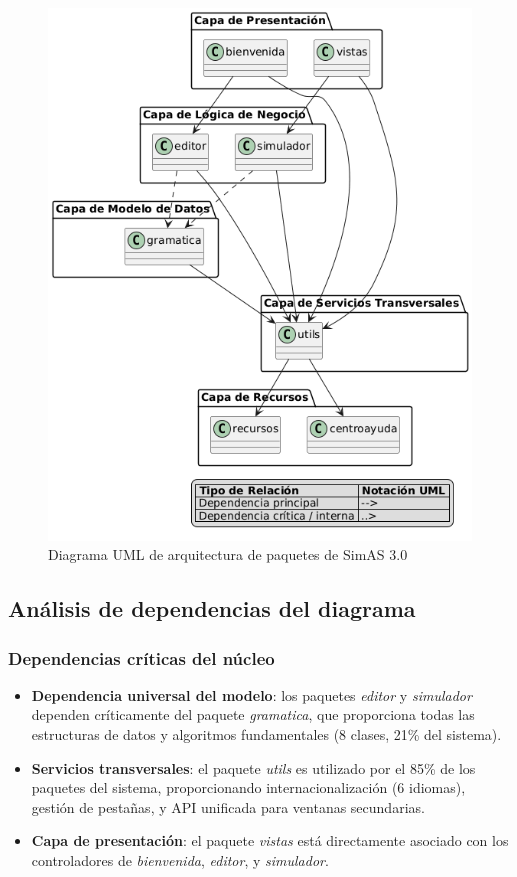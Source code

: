 \begin{figure}[H]
\centering
\includegraphics[width=\textwidth]{figuras/Cap8/diagrama_paquetes.png}
\caption{Diagrama UML de arquitectura de paquetes de SimAS 3.0}
\label{dpaquetes}
\end{figure}

\subsection{Análisis de dependencias del diagrama}

\subsubsection{Dependencias críticas del núcleo}

\begin{itemize}
    \item \textbf{Dependencia universal del modelo}: los paquetes \textit{editor} y \textit{simulador} dependen críticamente del paquete \textit{gramatica}, que proporciona todas las estructuras de datos y algoritmos fundamentales (8 clases, 21\% del sistema).

    \item \textbf{Servicios transversales}: el paquete \textit{utils} es utilizado por el 85\% de los paquetes del sistema, proporcionando internacionalización (6 idiomas), gestión de pestañas, y API unificada para ventanas secundarias.

    \item \textbf{Capa de presentación}: el paquete \textit{vistas} está directamente asociado con los controladores de \textit{bienvenida}, \textit{editor}, y \textit{simulador}.
\end{itemize}

